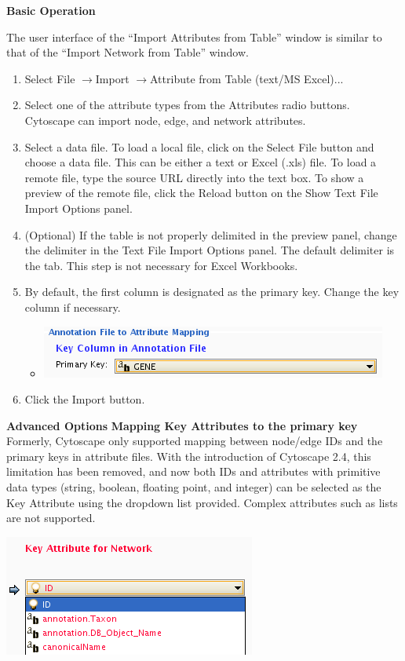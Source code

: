  \textbf{Basic Operation}

 The user interface of the ``Import Attributes from Table'' window is similar to that of the ``Import Network from Table'' window. 
\begin{enumerate}
\item Select File $\rightarrow$Import $\rightarrow$Attribute from Table (text/MS
Excel)... 
\item Select one of the attribute types from the Attributes radio buttons.
Cytoscape can import node, edge, and network attributes. 
\item Select a data file. To load a local file, click on the Select File button
and choose a data file. This can be either a text or Excel (.xls) file. To load
a remote file, type the source URL directly into the text box. To show a
preview of the remote file, click the Reload button on the Show Text File
Import Options panel. 
\item (Optional) If the table is not properly delimited in the preview panel,
change the delimiter in the Text File Import Options panel. The default
delimiter is the tab. This step is not necessary for Excel Workbooks. 
\item By default, the first column is designated as the primary key. Change the
key column if necessary.
\begin{itemize}
\item \includegraphics[width=\textwidth]{images/attribute_table_import_primary_key.png} 
\end{itemize}
\item Click the Import button. 
\end{enumerate}
 
\textbf{Advanced Options}
\textbf{Mapping Key Attributes to the primary key}
 Formerly, Cytoscape only supported mapping between node/edge IDs and the
primary keys in attribute files. With the introduction of Cytoscape 2.4, this
limitation has been removed, and now both IDs and attributes with primitive
data types (string, boolean, floating point, and integer) can be selected as
the Key Attribute using the dropdown list provided. Complex attributes such as
lists are not supported. 


 \includegraphics[width=\textwidth]{images/attribute_table_import_keyattr.png} 
 
